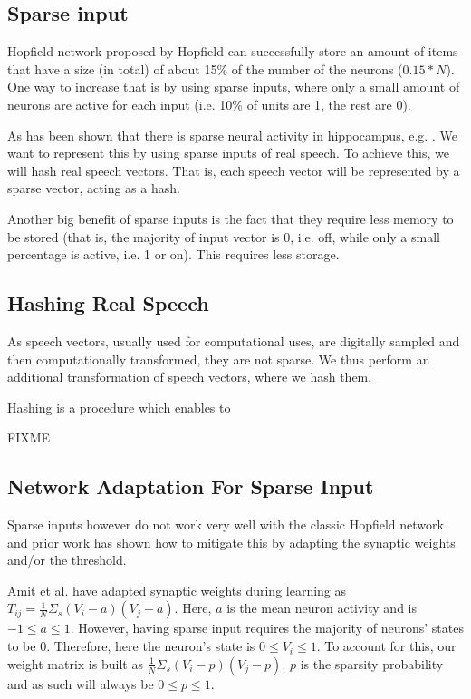 \documentclass{article}
\begin{document}
\subsection{Sparse input}

Hopfield network proposed by Hopfield \cite{hopfield1982neural} can successfully store an amount of items that have a size (in total) of about 15\% of the number of the neurons ($0.15*N$). One way to increase that is by using sparse inputs, where only a small amount of neurons are active for each input (i.e. 10\% of units are 1, the rest are 0). \cite{amit1987information}

As has been shown that there is sparse neural activity in hippocampus, e.g. \cite{karlsson2008network, guzman2016synaptic}. We want to represent this by using sparse inputs of real speech. To achieve this, we will hash real speech vectors. That is, each speech vector will be represented by a sparse vector, acting as a hash.

Another big benefit of sparse inputs is the fact that they require less memory to be stored (that is, the majority of input vector is 0, i.e. off, while only a small percentage is active, i.e. 1 or on). This requires less storage. 

\subsection{Hashing Real Speech}

As speech vectors, usually used for computational uses, are digitally sampled and then computationally transformed, they are not sparse. We thus perform an additional transformation of speech vectors, where we hash them.

Hashing is a procedure which enables to 

FIXME

\subsection{Network Adaptation For Sparse Input}

Sparse inputs however do not work very well with the classic Hopfield network \cite{amit1987information} and prior work has shown how to mitigate this by adapting the synaptic weights and/or the threshold.

Amit et al. \cite{amit1987information} have adapted synaptic weights during learning as $T_{ij} = \frac{1}{N}\Sigma_s (V_i - a)(V_j - a)$. Here, $a$ is the mean neuron activity and is $-1\leq a \leq 1$. However, having sparse input requires the majority of neurons' states to be 0. Therefore, here the neuron's state is $0 \leq V_i \leq 1$. To account for this, our weight matrix is built as $\frac{1}{N} \Sigma_s (V_i - p)(V_j - p)$. $p$ is the sparsity probability and as such will always be $0\leq p \leq 1$.
\end{document}
